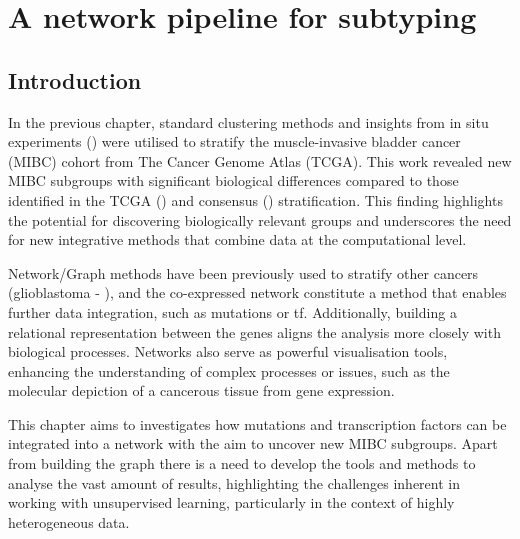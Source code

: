 \chapter{A network pipeline for subtyping} \label{s:N_I}


\vspace{3mm}
\vspace{3mm}


\section{Introduction}

In the previous chapter, standard clustering methods and insights from in situ experiments (\citet{Baker2022-bj}) were utilised to stratify the muscle-invasive bladder cancer (MIBC) cohort from The Cancer Genome Atlas (TCGA). This work revealed new MIBC subgroups with significant biological differences compared to those identified in the TCGA (\citet{Robertson2017-mg}) and consensus (\citet{Kamoun2020-tj}) stratification. This finding highlights the potential for discovering biologically relevant groups and underscores the need for new integrative methods that combine data at the computational level.

Network/Graph methods have been previously used to stratify other cancers (glioblastoma - \citet{Care2019-ij}), and the co-expressed network constitute a method that enables further data integration, such as mutations or \acrfull{tf}. Additionally, building a relational representation between the genes aligns the analysis more closely with biological processes. Networks also serve as powerful visualisation tools, enhancing the understanding of complex processes or issues, such as the molecular depiction of a cancerous tissue from gene expression.

This chapter aims to investigates how mutations and transcription factors can be integrated into a network with the aim to uncover new MIBC subgroups. Apart from building the graph there is a need to develop the tools and methods to analyse the vast amount of results, highlighting the challenges inherent in working with unsupervised learning, particularly in the context of highly heterogeneous data.

